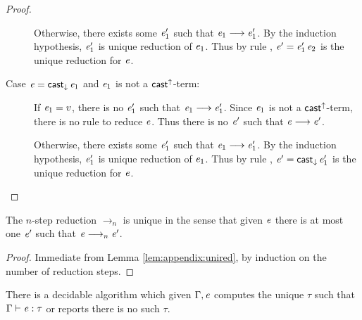 \begin{proof}
\begin{description}
		Otherwise, there exists some $\mathit{e'_{{\mathrm{1}}}}$ such that $\mathit{e_{{\mathrm{1}}}}  \longrightarrow  \mathit{e'_{{\mathrm{1}}}}$. By the
induction hypothesis, $\mathit{e'_{{\mathrm{1}}}}$ is unique reduction of $\mathit{e_{{\mathrm{1}}}}$. Thus by rule
, $\mathit{e}'=\mathit{e'_{{\mathrm{1}}}} \, \mathit{e_{{\mathrm{2}}}}$ is the unique reduction for $\mathit{e}$.
		\item[Case $\mathit{e}=\mathsf{cast}_{\downarrow} \, \mathit{e_{{\mathrm{1}}}}$ and $\mathit{e_{{\mathrm{1}}}}$ is not a $ \mathsf{cast}^{\uparrow} $-term:]
If $\mathit{e_{{\mathrm{1}}}}=v$, there is no $\mathit{e'_{{\mathrm{1}}}}$ such that $\mathit{e_{{\mathrm{1}}}}  \longrightarrow  \mathit{e'_{{\mathrm{1}}}}$. Since $\mathit{e_{{\mathrm{1}}}}$
is not a $ \mathsf{cast}^{\uparrow} $-term, there is no rule to reduce $\mathit{e}$. Thus there is
no $\mathit{e}'$ such that $\mathit{e}  \longrightarrow  \mathit{e'}$.
		
		Otherwise, there exists some $\mathit{e'_{{\mathrm{1}}}}$ such that $\mathit{e_{{\mathrm{1}}}}  \longrightarrow  \mathit{e'_{{\mathrm{1}}}}$. By the
induction hypothesis, $\mathit{e'_{{\mathrm{1}}}}$ is unique reduction of $\mathit{e_{{\mathrm{1}}}}$. Thus by rule
, $\mathit{e}'=\mathsf{cast}_{\downarrow} \, \mathit{e'_{{\mathrm{1}}}}$ is the unique reduction for
$\mathit{e}$.
	\end{description}
\end{proof}

\begin{lem}\label{lem:appendix:uniquen}
	The $n$-step reduction $ \longrightarrow_n $ is unique in the sense that given $\mathit{e}$
there is at most one $\mathit{e'}$ such that $\mathit{e}  \longrightarrow_n  \mathit{e'}$.
\end{lem}

\begin{proof}
	Immediate from Lemma \ref{lem:appendix:unired}, by induction on the number of
reduction steps.
\end{proof}

\begin{lem}
	There is a decidable algorithm which given $\Gamma, \mathit{e}$ computes the unique
$\tau$ such that $\Gamma  \vdash  \mathit{e}  :  \tau$ or reports there is no such $\tau$.
\end{lem}

